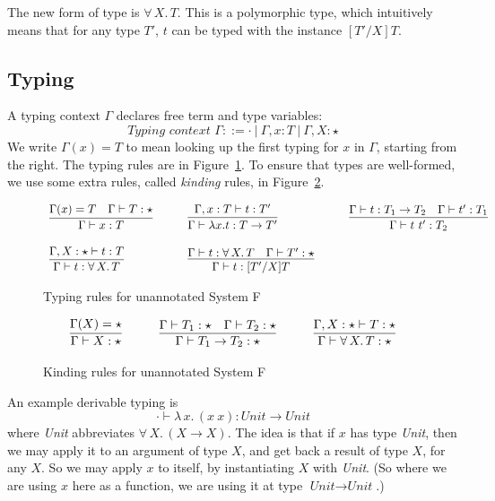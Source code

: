 \documentclass{article}
\begin{document}
The new form of type is $\forall\, X.\,T$.  This is a polymorphic
type, which intuitively means that for any type $T'$, $t$ can be typed
with the instance $[T'/X]T$.

\subsection{Typing}

A typing context $\Gamma$ declares free term and type variables:
\[
\textit{Typing context }\Gamma ::= \cdot\ |\ \Gamma, x:T\ |\ \Gamma, X : \star
\]
We write $\Gamma(x) = T$ to mean looking up the first typing for $x$ in $\Gamma$,
starting from the right.  The typing rules are in
Figure~\ref{fig:tp}.  To ensure that types are well-formed, we
use some extra rules, called \emph{kinding} rules, in Figure~\ref{fig:knd}.

\begin{figure}
\[
\begin{array}{lllll}
\infer{\Gamma \vdash x : T}{\Gamma(x) = T & \Gamma \vdash T : \star} &\ \ \ &
\infer{\Gamma \vdash \lambda x . t : T \to T'}{\Gamma, x : T \vdash t : T'} &\ \ \ &
\infer{\Gamma \vdash t\ t' : T_2}{\Gamma \vdash t : T_1 \to T_2 & \Gamma \vdash t' : T_1} \\ \\
\infer{\Gamma \vdash t : \forall \,X.\,T}{\Gamma,X : \star \vdash t : T} &\ \ \ &
\infer{\Gamma \vdash t : [T'/X]T}{\Gamma \vdash t : \forall\, X.\,T & \Gamma \vdash T' : \star} &\ \ \ &\
\end{array}
\]
\caption{Typing rules for unannotated System F}
\label{fig:tp}
\end{figure}

\begin{figure}
\[
\begin{array}{lllll}
\infer{\Gamma \vdash X : \star}{\Gamma(X) = \star} &\ \ \ &
\infer{\Gamma \vdash T_1 \to T_2 : \star}{\Gamma \vdash T_1 : \star & \Gamma \vdash T_2 : \star} &\ \ \ &
\infer{\Gamma \vdash \forall\, X.\,T : \star}{\Gamma,X : \star \vdash T : \star}
\end{array}
\]
\caption{Kinding rules for unannotated System F}
\label{fig:knd}
\end{figure}

An example derivable typing is
\[
\cdot \vdash \lambda\,x.\,(x\ x) : \textit{Unit} \to \textit{Unit}
\]
\noindent where \textit{Unit} abbreviates $\forall\,X.\,(X \to X)$.  The
idea is that if $x$ has type \textit{Unit}, then we may apply it to an argument
of type $X$, and get back a result of type $X$, for any $X$.  So we may apply $x$
to itself, by instantiating $X$ with \textit{Unit}.  (So where we are using $x$ here
as a function, we are using it at type $\textit{Unit} \to \textit{Unit}$.)
\end{document}

